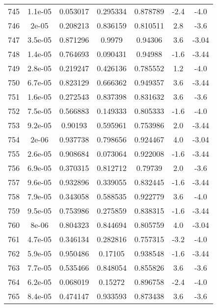 \begin{table}
\begin{tabular}{c|c|c|c|c|c|c}
745 & 1.1e-05 & 0.053017 & 0.295334 & 0.878789 & -2.4 & -4.0\\
746 & 2e-05 & 0.208213 & 0.836159 & 0.810511 & 2.8 & -3.6\\
747 & 3.5e-05 & 0.871296 & 0.9979 & 0.94306 & 3.6 & -3.04\\
748 & 1.4e-05 & 0.764693 & 0.090431 & 0.94988 & -1.6 & -3.44\\
749 & 2.8e-05 & 0.219247 & 0.426136 & 0.785552 & 1.2 & -4.0\\
750 & 6.7e-05 & 0.823129 & 0.666362 & 0.949357 & 3.6 & -3.44\\
751 & 1.6e-05 & 0.272543 & 0.837398 & 0.831632 & 3.6 & -3.6\\
752 & 7.5e-05 & 0.566883 & 0.149333 & 0.805333 & -1.6 & -4.0\\
753 & 9.2e-05 & 0.90193 & 0.595961 & 0.753986 & 2.0 & -3.44\\
754 & 2e-06 & 0.937738 & 0.798656 & 0.924467 & 4.0 & -3.04\\
755 & 2.6e-05 & 0.908684 & 0.073064 & 0.922008 & -1.6 & -3.44\\
756 & 6.9e-05 & 0.370315 & 0.812712 & 0.79739 & 2.0 & -3.6\\
757 & 9.6e-05 & 0.932896 & 0.339055 & 0.832445 & -1.6 & -3.44\\
758 & 7.9e-05 & 0.343058 & 0.588535 & 0.922779 & 3.6 & -4.0\\
759 & 9.5e-05 & 0.753986 & 0.275859 & 0.838315 & -1.6 & -3.44\\
760 & 8e-06 & 0.804323 & 0.844694 & 0.805759 & 4.0 & -3.04\\
761 & 4.7e-05 & 0.346134 & 0.282816 & 0.757315 & -3.2 & -4.0\\
762 & 5.9e-05 & 0.950486 & 0.17105 & 0.938548 & -1.6 & -3.44\\
763 & 7.7e-05 & 0.535466 & 0.848054 & 0.855826 & 3.6 & -3.6\\
764 & 6.2e-05 & 0.068019 & 0.15272 & 0.896758 & -2.4 & -4.0\\
765 & 8.4e-05 & 0.474147 & 0.933593 & 0.873438 & 3.6 & -3.6\\
\end{tabular}
\end{table}
\newpage
